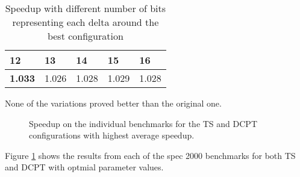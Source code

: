 \begin{table}[h]
\centering
\label{tab:deltabits}
\begin{tabular}{|l|l|l|l|l|}
\hline
\textbf{12}    & 13    & 14    & 15    & 16    \\ \hline
\textbf{1.033} & 1.026 & 1.028 & 1.029 & 1.028 \\ \hline
\end{tabular}
\smallskip
\caption{Speedup with different number of bits representing each delta around the best configuration}
\end{table}

None of the variations proved better than the original one.


\begin{figure}[h]
    \begin{centering}
        
        \caption{Speedup on the individual benchmarks for the TS and DCPT configurations with highest average speedup.}
        \label{figure:benchmarks-plot}
    \end{centering}
\end{figure}

Figure \ref{figure:benchmarks-plot} shows the results from each of the spec 2000 benchmarks for both TS and DCPT with optmial parameter values.
